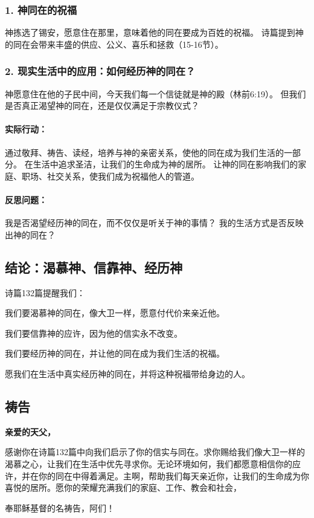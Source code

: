 \documentclass[a4paper, 12pt]{article}
\begin{document}
\subsubsection*{1. 神同在的祝福}
神拣选了锡安，愿意住在那里，意味着他的同在要成为百姓的祝福。
诗篇提到神的同在会带来丰盛的供应、公义、喜乐和拯救（15-16节）。
\subsubsection*{2. 现实生活中的应用：如何经历神的同在？}
神愿意住在他的子民中间，今天我们每一个信徒就是神的殿（林前6:19）。
但我们是否真正渴望神的同在，还是仅仅满足于宗教仪式？
\paragraph*{实际行动：}

通过敬拜、祷告、读经，培养与神的亲密关系，使他的同在成为我们生活的一部分。
在生活中追求圣洁，让我们的生命成为神的居所。
让神的同在影响我们的家庭、职场、社交关系，使我们成为祝福他人的管道。
\paragraph*{反思问题：}

我是否渴望经历神的同在，而不仅仅是听关于神的事情？
我的生活方式是否反映出神的同在？
\subsection*{结论：渴慕神、信靠神、经历神}
诗篇132篇提醒我们：

我们要渴慕神的同在，像大卫一样，愿意付代价来亲近他。

我们要信靠神的应许，因为他的信实永不改变。

我们要经历神的同在，并让他的同在成为我们生活的祝福。

愿我们在生活中真实经历神的同在，并将这种祝福带给身边的人。

\subsection*{祷告}
\textbf{亲爱的天父，}

感谢你在诗篇132篇中向我们启示了你的信实与同在。求你赐给我们像大卫一样的渴慕之心，让我们在生活中优先寻求你。无论环境如何，我们都愿意相信你的应许，并在你的同在中得着满足。主啊，帮助我们每天亲近你，让我们的生命成为你喜悦的居所。愿你的荣耀充满我们的家庭、工作、教会和社会，

奉耶稣基督的名祷告，阿们！
\newpage
\end{document}
